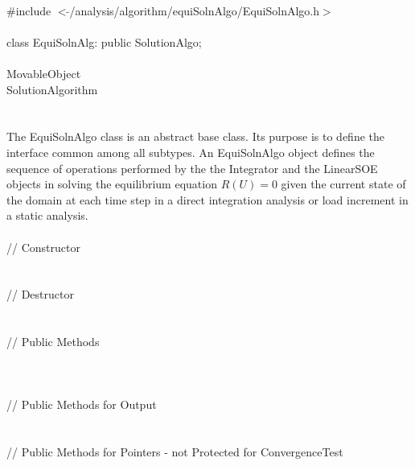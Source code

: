 
   \\
\indent \#include $<\tilde{
}$/analysis/algorithm/equiSolnAlgo/EquiSolnAlgo.h$>$  \\ 

  \\
\indent class EquiSolnAlg: public SolutionAlgo;  \\

 \\
\indent MovableObject \\
\indent\indent SolutionAlgorithm \\
\indent\indent{} \\

 \\ 
\indent The EquiSolnAlgo class is an abstract base class. Its
purpose is to define the interface common among all subtypes. An
EquiSolnAlgo object defines the sequence of operations 
performed by the the Integrator and the LinearSOE objects in
solving the equilibrium equation $R(U) = 0$ given the current state of
the domain at each time step in a direct integration analysis or load
increment in a static analysis. \\

 \\ 
\indent\indent // Constructor  \\ 
\indent{}\\ \\
\indent\indent // Destructor  \\
\indent{}\\ \\
\indent\indent // Public Methods  \\
\indent{} \\
\indent{} \\ \\
\indent\indent // Public Methods for Output \\
\indent{}\\ \\
\indent\indent // Public Methods for Pointers - not Protected for ConvergenceTest\\
\indent{}
\\ 
\indent{} \\ 
\indent{} \\ 

